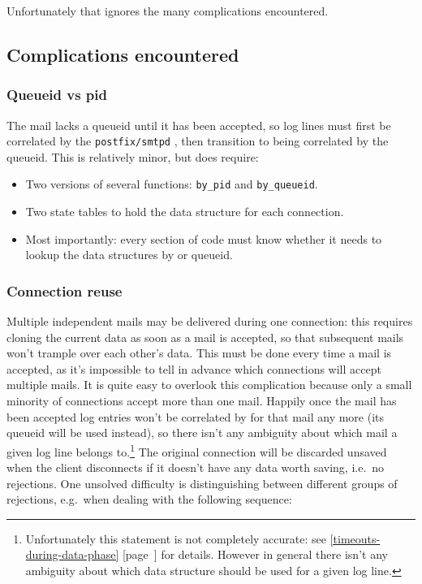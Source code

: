 \documentclass[a4paper,12pt,draft]{article}
\newcommand{\refwithpage}[1]{%
    \empty{}\ref{#1} [page~\pageref{#1}]%
}
\newcommand{\sectionref}[1]{%
    \textsection{}\refwithpage{#1}%
}
\newcommand{\daemon}[1]{%
    \texttt{postfix/#1}%
}
\begin{document}
Unfortunately that ignores the many complications encountered.


\subsection{Complications encountered}

\label{complications}


\subsubsection{Queueid vs pid}

The mail lacks a queueid until it has been accepted, so log lines must
first be correlated by the \daemon{smtpd} \pid{}, then transition to being
correlated by the queueid.  This is relatively minor, but does require:

\begin{itemize}

    \item Two versions of several functions: \texttt{by\_pid} and
        \texttt{by\_queueid}.

    \item Two state tables to hold the data structure for each connection.

    \item Most importantly: every section of code must know whether it
        needs to lookup the data structures by \pid{} or queueid.

\end{itemize}

\subsubsection{Connection reuse}

\label{connection reuse}

Multiple independent mails may be delivered during one connection: this
requires cloning the current data as soon as a mail is accepted, so that
subsequent mails won't trample over each other's data.  This must be done
every time a mail is accepted, as it's impossible to tell in advance which
connections will accept multiple mails.  It is quite easy to overlook this
complication because only a small minority of connections accept more than
one mail. Happily once the mail has been accepted log entries won't be
correlated by \pid{} for that mail any more (its queueid will be used
instead), so there isn't any ambiguity about which mail a given log line
belongs to.\footnote{Unfortunately this statement is not completely
accurate: see \sectionref{timeouts-during-data-phase} for details.  However
in general there isn't any ambiguity about which data structure should be
used for a given log line.}  The original connection will be discarded
unsaved when the client disconnects if it doesn't have any data worth
saving, i.e.\ no rejections.  One unsolved difficulty is distinguishing
between different groups of rejections, e.g.\ when dealing with the
following sequence:
\end{document}
